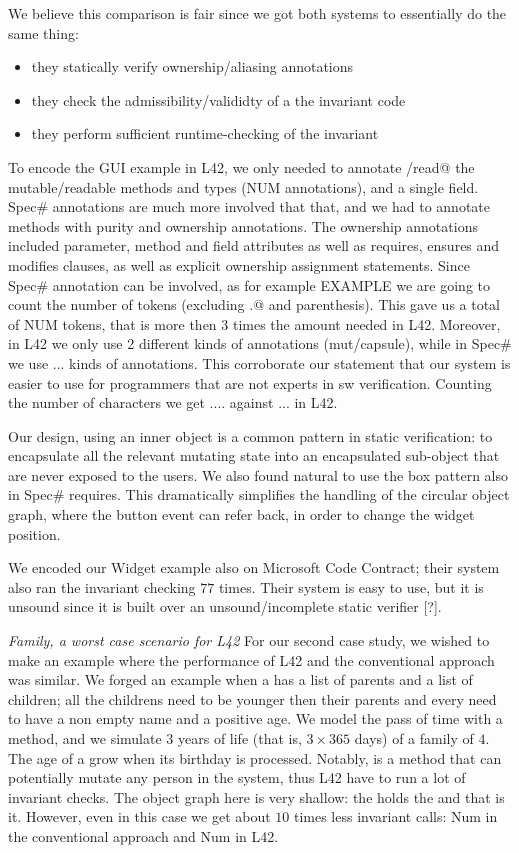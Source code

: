 We believe this comparison is fair since we got both systems to essentially do the same thing:
\begin{itemize}
\item they statically verify ownership/aliasing annotations
\item they check the admissibility/valididty of a the invariant code
\item they perform sufficient runtime-checking of the invariant
\end{itemize}
To encode the GUI example in L42, we only needed to annotate \Q@mut/read@ the mutable/readable methods
and types (NUM annotations), and \Q@capsule@ a single field. 
Spec\# annotations are much more involved that that, and we had to annotate methods
with purity and ownership annotations. The ownership annotations included parameter, method and field attributes as well as requires, ensures and modifies clauses, as well as explicit ownership assignment statements.
Since Spec\# annotation can be involved, as for example EXAMPLE
we are going to count the number of tokens (excluding \Q@.@ and parenthesis).
This gave us a total of NUM tokens, that is more then 3 times the amount needed in L42.
Moreover, in L42 we only use 2 different kinds of annotations (mut/capsule), while in Spec\# we use ... kinds of annotations. This corroborate our statement that our system is easier to use for programmers that are not experts in sw verification.
Counting the number of characters we get .... against ... in L42.  

Our design, using an inner \Q@Box@ object is a common pattern in static verification: to encapsulate all the relevant mutating state into an encapsulated sub-object
that are never exposed to the users.
We also found natural to use the box pattern
also in Spec\# requires.
This dramatically simplifies the handling of the circular object graph, where the button event can refer back, in order to change the widget position.

We encoded our Widget example also on Microsoft Code Contract; their system also ran the invariant checking $77$ times. Their system is easy to use, but it is unsound since it is built over an unsound/incomplete static verifier [?].

\noindent\textit{Family, a worst case scenario for L42}
For our second case study, we wished to make an example where the performance of L42 and the conventional approach was similar. We forged an example when a \Q@Family@ has a list of parents and a list of children;
all the childrens need to be younger then their parents and every \Q@Person@ need to have a non empty name and a positive age.  
We model the pass of time with a \Q@processDay@ method, and we simulate $3$ years of life (that is, $3\times365$ days) of a family of $4$.
The age of a \Q@Person@ grow when its birthday is processed.
Notably, \Q@processDay@ is a \Q@mut@ method that can potentially mutate any person in the system, thus
L42 have to run a lot of invariant checks. The object graph here is very shallow: the \Q@Family@ holds the \Q@Person@s and that is it.
However, even in this case we get about $10$ times less invariant calls: Num in the conventional approach and Num in L42.

